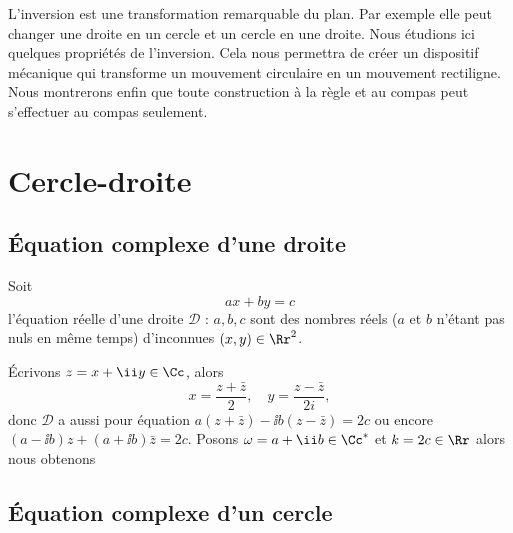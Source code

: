 \documentclass[11pt,class=report,crop=false]{standalone}
\begin{document}

L'inversion est une transformation remarquable du plan. Par exemple elle peut changer une droite en un cercle
et un cercle en une droite. Nous étudions ici quelques propriétés de l'inversion. Cela nous permettra de créer un dispositif mécanique qui transforme un mouvement circulaire en un mouvement rectiligne. Nous montrerons enfin que toute construction à la règle et au compas peut s'effectuer au compas seulement.

\section{Cercle-droite}

\subsection{\'Equation complexe d'une droite}

Soit 
$$ax+by=c$$ 
l'équation réelle d'une droite $\mathcal{D}$ : $a,b,c$ sont des nombres réels
($a$ et $b$ n'étant pas nuls en même temps) d'inconnues $(x,y) \in \Rr^2$.



\'Ecrivons $z=x+\ii y \in \Cc$, alors 
$$x = \frac{z+\bar z}{2}, \quad y = \frac{z - \bar z}{2i},$$
donc $\mathcal{D}$ a aussi pour équation
$a(z+\bar z) -\ii b(z-\bar z)=2c$ ou encore $(a-\ii b)z+(a+\ii b)\bar z = 2c$.
Posons $\omega = a+\ii b \in \Cc^*$ et $k=2c \in \Rr$ alors nous obtenons\\

\subsection{\'Equation complexe d'un cercle}
\end{document}

